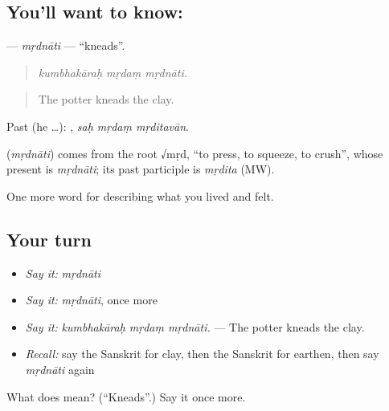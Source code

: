 \subsection*{You'll want to know: }
\textbf{} — \emph{mṛdnāti} — \textquotedblleft{}kneads\textquotedblright{}.

\begin{quote}
  
\end{quote}

\begin{quote}
\emph{kumbhakāraḥ mṛdaṃ mṛdnāti.}
\end{quote}

\begin{quote}
The potter kneads the clay.
\end{quote}

Past (he …):   , \emph{saḥ mṛdaṃ mṛditavān}.

\begin{cousinweb}
\textbf{} (\emph{mṛdnāti}) comes from the root √mṛd, \textquotedblleft{}to press, to squeeze, to crush\textquotedblright{}, whose present is \emph{mṛdnāti}; its past participle is \emph{mṛdita} (MW).
\end{cousinweb}

\begin{grammarlens}[title={What you've built}]
One more word for describing what you lived and felt.
\end{grammarlens}

\subsection*{Your turn}
\begin{itemize}
\raggedright
  \item \emph{Say it:} \emph{mṛdnāti}
  \item \emph{Say it:} \emph{mṛdnāti}, once more
  \item \emph{Say it:} \emph{kumbhakāraḥ mṛdaṃ mṛdnāti.} — The potter kneads the clay.
  \item \emph{Recall:} say the Sanskrit for clay, then the Sanskrit for earthen, then say \emph{mṛdnāti} again
\end{itemize}

\begin{tcolorbox}[breakable,colback=teal!4,colframe=teal!35!black,title={Before you move on}]
What does  mean? (\textquotedblleft{}Kneads\textquotedblright{}.) Say it once more.
\end{tcolorbox}
